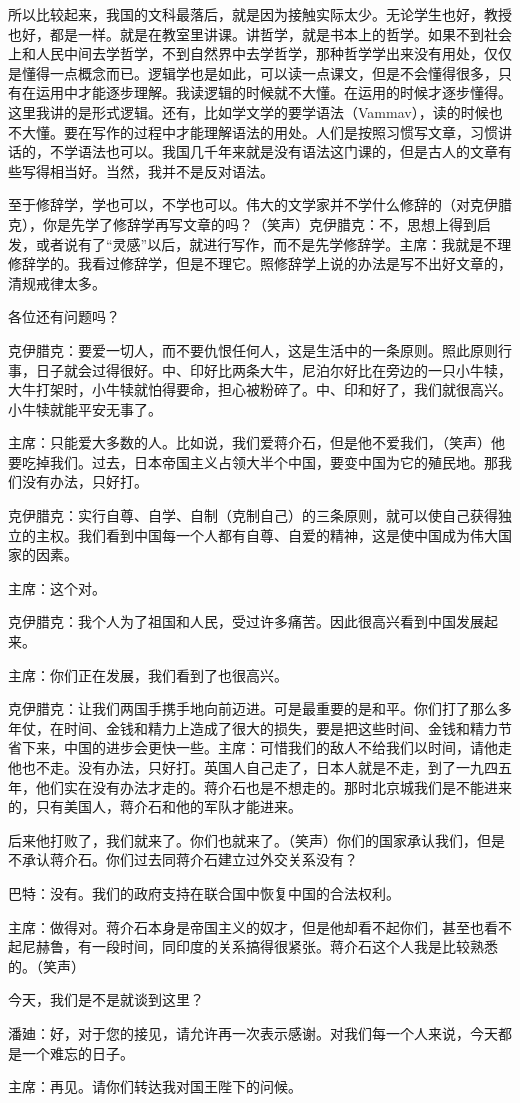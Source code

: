 所以比较起来，我国的文科最落后，就是因为接触实际太少。无论学生也好，教授也好，都是一样。就是在教室里讲课。讲哲学，就是书本上的哲学。如果不到社会上和人民中间去学哲学，不到自然界中去学哲学，那种哲学学出来没有用处，仅仅是懂得一点概念而已。逻辑学也是如此，可以读一点课文，但是不会懂得很多，只有在运用中才能逐步理解。我读逻辑的时候就不大懂。在运用的时候才逐步懂得。这里我讲的是形式逻辑。还有，比如学文学的要学语法（Vammav），读的时候也不大懂。要在写作的过程中才能理解语法的用处。人们是按照习惯写文章，习惯讲话的，不学语法也可以。我国几千年来就是没有语法这门课的，但是古人的文章有些写得相当好。当然，我并不是反对语法。

至于修辞学，学也可以，不学也可以。伟大的文学家并不学什么修辞的（对克伊腊克），你是先学了修辞学再写文章的吗？（笑声）克伊腊克：不，思想上得到启发，或者说有了“灵感”以后，就进行写作，而不是先学修辞学。主席：我就是不理修辞学的。我看过修辞学，但是不理它。照修辞学上说的办法是写不出好文章的，清规戒律太多。

各位还有问题吗？

克伊腊克：要爱一切人，而不要仇恨任何人，这是生活中的一条原则。照此原则行事，日子就会过得很好。中、印好比两条大牛，尼泊尔好比在旁边的一只小牛犊，大牛打架时，小牛犊就怕得要命，担心被粉碎了。中、印和好了，我们就很高兴。小牛犊就能平安无事了。

主席：只能爱大多数的人。比如说，我们爱蒋介石，但是他不爱我们，（笑声）他要吃掉我们。过去，日本帝国主义占领大半个中国，要变中国为它的殖民地。那我们没有办法，只好打。

克伊腊克：实行自尊、自学、自制（克制自己）的三条原则，就可以使自己获得独立的主权。我们看到中国每一个人都有自尊、自爱的精神，这是使中国成为伟大国家的因素。

主席：这个对。

克伊腊克：我个人为了祖国和人民，受过许多痛苦。因此很高兴看到中国发展起来。

主席：你们正在发展，我们看到了也很高兴。

克伊腊克：让我们两国手携手地向前迈进。可是最重要的是和平。你们打了那么多年仗，在时间、金钱和精力上造成了很大的损失，要是把这些时间、金钱和精力节省下来，中国的进步会更快一些。主席：可惜我们的敌人不给我们以时间，请他走他也不走。没有办法，只好打。英国人自己走了，日本人就是不走，到了一九四五年，他们实在没有办法才走的。蒋介石也是不想走的。那时北京城我们是不能进来的，只有美国人，蒋介石和他的军队才能进来。

后来他打败了，我们就来了。你们也就来了。（笑声）你们的国家承认我们，但是不承认蒋介石。你们过去同蒋介石建立过外交关系没有？

巴特：没有。我们的政府支持在联合国中恢复中国的合法权利。

主席：做得对。蒋介石本身是帝国主义的奴才，但是他却看不起你们，甚至也看不起尼赫鲁，有一段时间，同印度的关系搞得很紧张。蒋介石这个人我是比较熟悉的。（笑声）

今天，我们是不是就谈到这里？

潘廸：好，对于您的接见，请允许再一次表示感谢。对我们每一个人来说，今天都是一个难忘的日子。

主席：再见。请你们转达我对国王陛下的问候。


